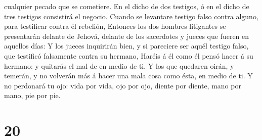 cualquier pecado que se cometiere. En el dicho de dos testigos, ó en el
dicho de tres testigos consistirá el negocio.  Cuando se
levantare testigo falso contra alguno, para testificar contra él
rebelión,  Entonces los dos hombres litigantes se
presentarán delante de Jehová, delante de los sacerdotes y jueces que
fueren en aquellos días:  Y los jueces inquirirán bien, y
si pareciere ser aquél testigo falso, que testificó falsamente contra su
hermano,  Haréis á él como él pensó hacer á su hermano: y
quitarás el mal de en medio de ti.  Y los que quedaren
oirán, y temerán, y no volverán más á hacer una mala cosa como ésta, en
medio de ti.  Y no perdonará tu ojo: vida por vida, ojo por
ojo, diente por diente, mano por mano, pie por pie.

\hypertarget{section-19}{%
\section{20}\label{section-19}}

